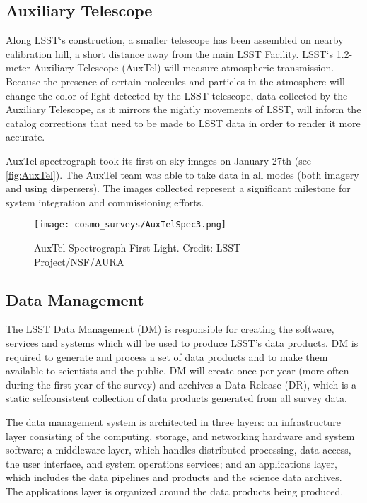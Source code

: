 \subsection{Auxiliary Telescope}
Along LSST`s construction, a smaller telescope has been assembled on nearby calibration hill, a short distance away from the main LSST Facility. LSST`s 1.2-meter Auxiliary Telescope (AuxTel) will measure atmospheric transmission. Because the presence of certain molecules and particles in the atmosphere will change the color of light detected by the LSST telescope, data collected by the Auxiliary Telescope, as it mirrors the nightly movements of LSST, will inform the catalog corrections that need to be made to LSST data in order to render it more accurate.

AuxTel spectrograph took its first on-sky images on January 27th (see \autoref{fig:AuxTel}). The AuxTel team was able to take data in all modes (both imagery and using dispersers). The images collected represent a significant milestone for system integration and commissioning efforts.

\begin{figure}[ht]
    \centering
    \texttt{[image: cosmo\_surveys/AuxTelSpec3.png]}
    \caption{AuxTel Spectrograph First Light. Credit: LSST Project/NSF/AURA}
    \label{fig:AuxTel}
\end{figure}
\subsection{Data Management}
The LSST Data Management (DM) is responsible for creating the software, services and systems which will be used to produce LSST's data products. DM is required to generate and process a set of data products and to make them available to scientists and the public. DM will create once per year (more often during the first year of the survey) and archives a Data Release (DR), which is a static selfconsistent collection of data products generated from all survey data.

The data management system is architected in three layers: an infrastructure layer consisting of the computing, storage, and networking hardware and system software; a middleware layer, which handles distributed processing, data access, the user interface, and system operations services; and an applications layer, which includes the data pipelines and products and the science data archives. The applications layer is organized around the data products being produced.

